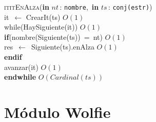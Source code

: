 \documentclass[10pt, a4paper]{article}
\let\NombreFuncion=\textsc
\let\TipoVariable=\texttt
\let\ModificadorArgumento=\textbf
\newcommand{\tab}{\hspace*{7mm}}
\newcommand{\In}[2]{\ModificadorArgumento{in} \ensuremath{#1}\,: \TipoVariable{#2}\xspace}
\begin{document}
  \NombreFuncion{ititEnAlza}(\In{nt}{nombre},\ \In{ts}{conj(estr)})
\\
\tab it\ $\leftarrow$ CrearIt(ts) \hfill $O(1)$
\\
\tab while(HaySiguiente(it)) \hfill $O(1)$
\\
\tab \tab \textbf{if}(nombre(Siguiente(ts))\ =\ nt) \hfill $O(1)$
\\
\tab \tab \tab res\ $\leftarrow$\ Siguiente(ts).enAlza \hfill $O(1)$
\\
\tab \tab \textbf{endif}
\\
\tab \tab avanzar(it) \hfill $O(1)$
\\
\tab \textbf{endwhile} \hfill $O(Cardinal(ts))$
\\




\section{M\'{o}dulo Wolfie}
\end{document}
